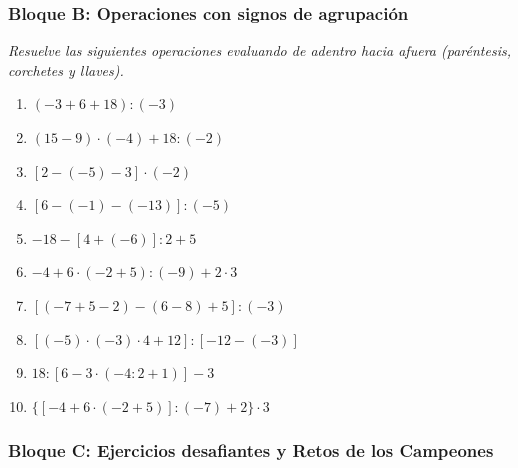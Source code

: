 \documentclass[12pt, letterpaper]{article}
\begin{document}
\subsubsection*{Bloque B: Operaciones con signos de agrupación}
\textit{Resuelve las siguientes operaciones evaluando de adentro hacia afuera (paréntesis, corchetes y llaves).}

\begin{enumerate}[leftmargin=*, start=104]
  \item \facil{} $(-3 + 6 + 18) : (-3)$

  \item \facil{} $(15 - 9) \cdot (-4) + 18 : (-2)$

  \item \medio{} $[2 - (-5) - 3] \cdot (-2)$

  \item \medio{} $[6 - (-1) - (-13)] : (-5)$

  \item \medio{} $-18 - [4 + (-6)] : 2 + 5$

  \item \medio{} $-4 + 6 \cdot (-2 + 5) : (-9) + 2 \cdot 3$

  \item \dificil{} $[(-7 + 5 - 2) - (6 - 8) + 5] : (-3)$

  \item \dificil{} $[(-5) \cdot (-3) \cdot 4 + 12] : [-12 - (-3)]$

  \item \dificil{} $18 : [6 - 3 \cdot (-4 : 2 + 1)] - 3$

  \item \dificil{} $\{[-4 + 6 \cdot (-2 + 5)] : (-7) + 2\} \cdot 3$
\end{enumerate}

\subsubsection*{Bloque C: Ejercicios desafiantes y Retos de los Campeones}
\end{document}
